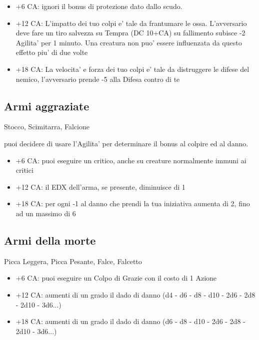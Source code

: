 \documentclass[a4paper,11pt,twoside,openany]{book}
\begin{document}
	\begin{itemize}
		\item +6 CA: ignori il bonus di protezione dato dallo scudo.
		
		\item +12 CA: L'impatto dei tuo colpi e' tale da frantumare le ossa. L'avversario deve fare un tiro salvezza su Tempra (DC 10+CA) su fallimento subisce -2 Agilita' per 1 minuto. Una creatura non puo' essere influenzata da questo effetto piu' di due volte
		
		\item +18 CA: La velocita' e forza dei tuo colpi e' tale da distruggere le difese del nemico, l'avversario prende -5 alla Difesa contro di te 
	\end{itemize}
	
	\subsection{Armi aggraziate} Stocco, Scimitarra, Falcione
	
	puoi decidere di usare l'Agilita' per determinare il bonus al colpire
	ed al danno.
	
	\begin{itemize}
		\item +6 CA: puoi eseguire un critico, anche su creature normalmente immuni
		ai critici
		
		\item +12 CA: il EDX dell'arma, se presente, diminuisce di 1
		
		\item +18 CA: per ogni -1 al danno che prendi la tua iniziativa aumenta di 2, fino ad un massimo di 6
	\end{itemize}
	
	\subsection{Armi della morte} Picca Leggera, Picca Pesante, Falce, Falcetto
	
	\begin{itemize}
		\item +6 CA: puoi eseguire un Colpo di Grazie con il costo di 1 Azione
		
		\item +12 CA: aumenti di un grado il dado di danno (d4 - d6 - d8 - d10 - 2d6 - 2d8 - 2d10 - 3d6...)
		
		\item +18 CA: aumenti di un grado il dado di danno (d6 - d8 - d10 - 2d6 - 2d8 - 2d10 - 3d6...)
		
	\end{itemize}
	
\end{document}
